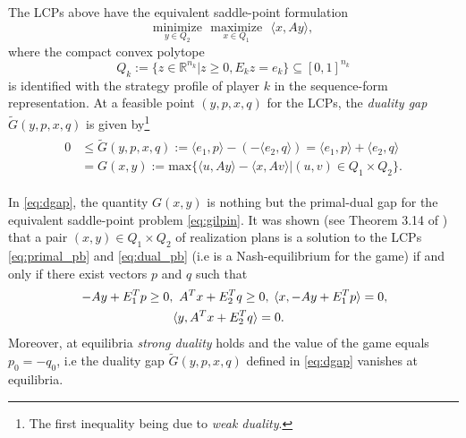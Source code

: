 \documentclass[a4paper,9pt]{extarticle}
\begin{document}
The LCPs above have the equivalent saddle-point formulation
\begin{equation}
  \underset{y \in Q_2}{\text{minimize}}\text{ }\underset{x \in
    Q_1}{\text{maximize}}\text{ }\langle x, Ay\rangle,
  \label{eq:gilpin}
\end{equation}
where the compact convex polytope
\begin{equation}
  Q_k := \{z \in \mathbb{R}^{n_k} | z \ge 0, E_kz = e_k\} \subseteq
  [0, 1]^{n_k}
\label{eq:polytope}
\end{equation}
is identified with the strategy profile of player $k$ in the
sequence-form representation. At a feasible point $(y, p, x, q)$ for
the LCPs, the \textit{duality gap} $\tilde{G}(y, p, x, q)$ is
given by\footnote{The first inequality being due to \textit{weak
    duality}.}
\begin{eqnarray}
  \begin{split}
  0 &\le \tilde{G}(y, p, x, q) := \langle e_1, p\rangle - (-\langle
  e_2, q\rangle) = \langle e_1, p\rangle + \langle
  e_2, q\rangle\\
  &= G(x, y) := \mathrm{max}\{\langle u, Ay\rangle - \langle x, Av\rangle |
(u,v) \in Q_1 \times Q_2\}.
\end{split}
  \label{eq:dgap}
\end{eqnarray}

In \eqref{eq:dgap}, the quantity $G(x, y)$ is nothing but the primal-dual
gap for the equivalent saddle-point problem \eqref{eq:gilpin}.
It was shown (see Theorem 3.14 of \cite{vonequilibrium}) that a pair
$(x, y) \in Q_1 \times Q_2$ of realization plans is a solution to the
LCPs \eqref{eq:primal_pb} and \eqref{eq:dual_pb} (i.e is a
Nash-equilibrium for the game)  if and only if there exist vectors $p$
and $q$ such that
\begin{equation}
\begin{split}
\hspace{.25em} -Ay + E_1^Tp \ge 0, &\hspace{.5em}A^Tx + E_2^Tq \ge
0, \hspace{.25em} \langle x, -Ay + E_1^Tp\rangle = 0,\\
&\langle y, A^Tx  + E_2^Tq\rangle = 0.
\end{split}
\label{eq:feasibility}
\end{equation}
Moreover, at equilibria \textit{strong duality} holds and the value
of the game equals $p_0 = -q_0$, i.e the duality gap
$\tilde{G}(y, p, x, q)$ defined in \eqref{eq:dgap} vanishes at
equilibria.%
\end{document}
